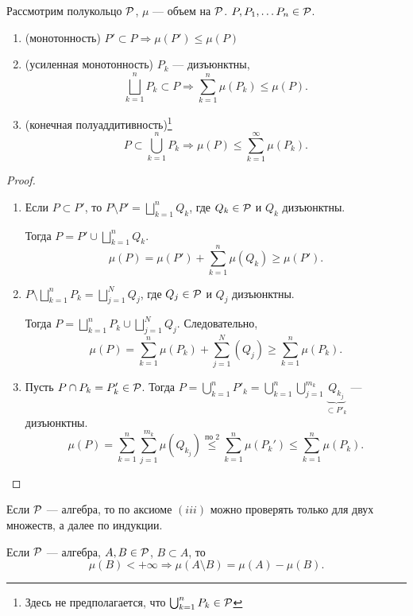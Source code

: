 \begin{thm}
	Рассмотрим полукольцо $ \P$,  $ \mu $ --- объем на $ \P$. $ P, P_1, \ldots P_n \in \P$.
	\begin{enumerate}[noitemsep]
		\item (монотонность) $ P' \subset P \Longrightarrow \mu(P') \le \mu(P)$
		\item (усиленная монотонность) $ P_k$ --- дизъюнктны,
			\[
				\bigsqcup_{k=1}^{n} P_{k} \subset P \Longrightarrow \sum_{k=1}^{n} \mu(P_k) \le \mu(P)
			.\] 
		\item (конечная полуаддитивность)\footnote{Здесь не предполагается, что $ \bigcup_{k=1}^{n} P_k \in \P$} \[
				P \subset \bigcup_{k=1}^{n} P_k \Longrightarrow \mu (P) \le \sum_{k=1}^{\infty} \mu(P_k)
		.\] 
	\end{enumerate} 
\end{thm}
\begin{proof}
	$ $
    \begin{enumerate}
        \item Если $ P \subset P'$, то $ P \setminus P' = \bigsqcup\limits_{k=1}^{n} Q_k$, где  $ Q_k \in \P$ и $ Q_k$ дизъюнктны.
			
			Тогда $ P = P' \cup \bigsqcup\limits_{k=1}^{n} Q_k$.
			\[
				\mu(P) = \mu (P') + \sum_{k=1}^{n} \mu (Q_k) \ge \mu (P')
			.\] 
		\item $ P \setminus \bigsqcup\limits_{k=1}^{n} P_k = \bigsqcup\limits_{j=1}^{N} Q_j$, где $ Q_j \in \P$ и $ Q_j$ дизъюнктны. 

			Тогда $ P = \bigsqcup\limits_{k=1}^{n} P_k \cup \bigsqcup\limits_{j=1}^{N} Q_j$. Следовательно,
			\[
				\mu(P) = \sum_{k=1}^{n} \mu (P_k) + \sum_{j=1}^{N} (Q_j) \ge \sum_{k=1}^{n} \mu (P_k)
			.\] 
		\item Пусть $ P \cap P_k = P_{k}' \in \P$. Тогда $ P = \bigcup\limits_{k=1}^{n} P'_k = \bigcup\limits_{k=1}^{n} \bigcup\limits_{j=1}^{m_k} \underbrace{Q_{k_j}}_{\subset P'_k}$ --- дизъюнктны.
			\[
				\mu (P) = \sum_{k=1}^{n} \sum_{j=1}^{m_k} \mu (Q_{k_j}) \stackrel{\text{по 2}}{ \le } \sum_{k=1}^{n} \mu (P_k') \le \sum_{k=1}^{n} \mu (P_k)
			.\] 
    \end{enumerate} 
\end{proof}
\begin{note}
	Если $ \P$ --- алгебра, то по аксиоме $ (iii)$ можно проверять только для двух множеств, а далее по индукции.
\end{note}
\begin{note}
    Если $ \P$ --- алгебра, $ A, B \in \P$, $ B \subset A$, то
	\[
		\mu (B) < +\infty \Longrightarrow \mu (A\setminus B) = \mu (A) - \mu (B)
	.\] 
\end{note}


